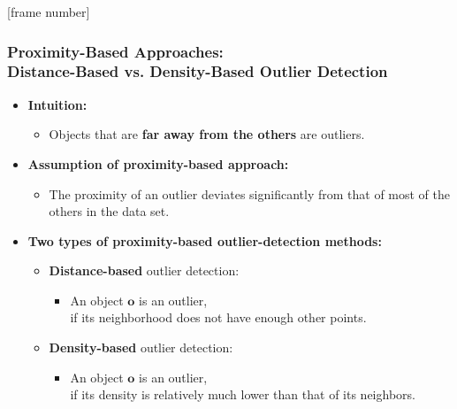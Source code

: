 \documentclass[aspectratio=169,t,xcolor=dvipsnames]{beamer}
\begin{document}
{
  [frame number]
  \begin{frame}
  	\frametitle{Proximity-Based Approaches: \\
    Distance-Based vs. Density-Based Outlier Detection}
  	\begin{itemize}
  		\item \textbf{Intuition:}
  		      \begin{itemize}
  		      	\item Objects that are \textbf{far away from the others} are outliers.
  		      \end{itemize}
  		\item \textbf{Assumption of proximity-based approach:}
  		      \begin{itemize}
  		      	\item The proximity of an outlier deviates significantly from that of most of the others in the data set.
  		      \end{itemize}
  		\item \textbf{Two types of proximity-based outlier-detection methods:}
  		      \begin{itemize}
  		      	\item \textbf{\color{airforceblue}Distance-based} outlier detection:
  		      	      \begin{itemize}
  		      	      	\item An object $\mathbf{o}$ is an outlier, \\
                      if its neighborhood does not have enough other points.
  		      	      \end{itemize}
  		      	\item \textbf{\color{airforceblue}Density-based} outlier detection:
  		      	      \begin{itemize}
  		      	      	\item An object $\mathbf{o}$ is an outlier, \\
                      if its density is relatively much lower than that of its neighbors.
  		      	      \end{itemize}
  		      \end{itemize}
  	\end{itemize}
  \end{frame}
}
\end{document}
